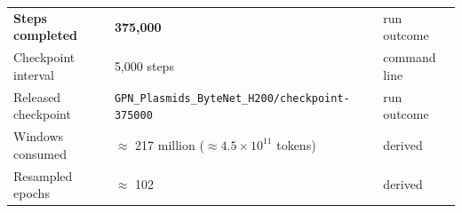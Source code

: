 {\begin{longtable}{p{}p{}p{}}
\textbf{Steps completed} & \textbf{375,000} & run outcome \\
Checkpoint interval & 5,000 steps & command line \\
Released checkpoint & \texttt{GPN\_\allowbreak Plasmids\_\allowbreak ByteNet\_\allowbreak H200/\allowbreak checkpoint-375000} & run outcome \\
Windows consumed & $\approx$ 217 million ($\approx 4.5 \times 10^{11}$ tokens) & derived \\
Resampled epochs & $\approx$ 102 & derived \\
\end{longtable}
}


\clearpage

\begin{table}
\caption{
Region-level ranking metrics --- mean average precision (mAP), Precision@1 (P@1), Recall@1 (R@1) and NDCG, mean $\pm$ s.d. over the five similarity-aware splits; every method and baseline, both tasks. Reference tool = oriTfinder2 (\emph{oriT}) / OriV-Finder (\emph{oriV}), training-split database. Colours match the figure legend.
}
\label{tab:supp-region-metrics}
\centering
{}
\end{table}
